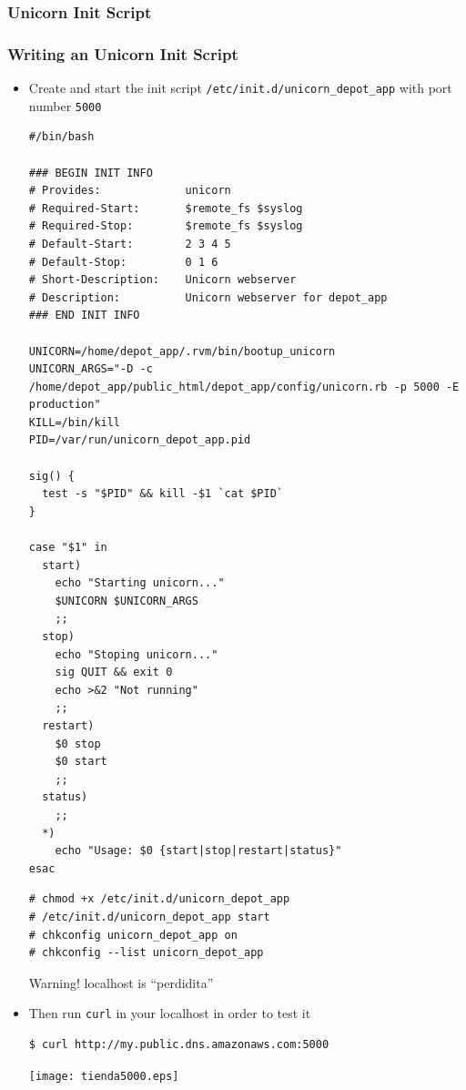 \documentclass{beamer}
\begin{document}
\subsubsection{Unicorn Init Script}
\begin{frame}
\frametitle{Writing an Unicorn Init Script}
\begin{itemize}
\item Create and start the init script \texttt{/etc/init.d/unicorn\_depot\_app} with port number \texttt{\alert{5000}}
\lstset{language=shell, numbers=left}
\begin{lstlisting}[escapechar=!]
#/bin/bash

### BEGIN INIT INFO
# Provides:             unicorn
# Required-Start:       $remote_fs $syslog
# Required-Stop:        $remote_fs $syslog
# Default-Start:        2 3 4 5
# Default-Stop:         0 1 6
# Short-Description:    Unicorn webserver
# Description:          Unicorn webserver for depot_app
### END INIT INFO

UNICORN=/home/depot_app/.rvm/bin/bootup_unicorn
UNICORN_ARGS="-D -c /home/depot_app/public_html/depot_app/config/unicorn.rb -p 5000 -E production"
KILL=/bin/kill
PID=/var/run/unicorn_depot_app.pid

sig() {
  test -s "$PID" && kill -$1 `cat $PID`
}

case "$1" in
  start)
    echo "Starting unicorn..."
    $UNICORN $UNICORN_ARGS
    ;;
  stop)
    echo "Stoping unicorn..."
    sig QUIT && exit 0
    echo >&2 "Not running"
    ;;
  restart)
    $0 stop
    $0 start
    ;;
  status)
    ;;
  *)
    echo "Usage: $0 {start|stop|restart|status}"
esac
\end{lstlisting}

\lstset{language=shell, escapechar=!}
\begin{lstlisting}[escapechar=!]
# chmod +x /etc/init.d/unicorn_depot_app
# /etc/init.d/unicorn_depot_app start
# chkconfig unicorn_depot_app on
# chkconfig --list unicorn_depot_app
\end{lstlisting}

\begin{block}{Warning!}
  localhost is ``perdidita''
\end{block}

\item Then run \texttt{curl} in your \alert{localhost} in order to test it

\begin{lstlisting}[escapechar=&]
$ curl http://my.public.dns.amazonaws.com:5000
\end{lstlisting}


\texttt{[image: tienda5000.eps]}

\end{itemize}

\end{frame}
\end{document}
